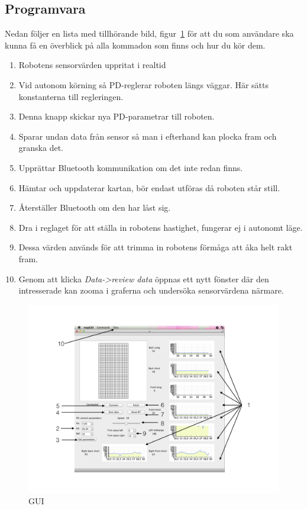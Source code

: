 \documentclass[a4paper,12pt,fleqn]{article}
\begin{document}
\subsection{Programvara}
Nedan följer en lista med tillhörande bild, figur~\ref{fig:gui_man} för att du som användare ska kunna få en överblick på alla kommadon som finns och hur du kör dem. 

\begin{enumerate}
	\item Robotens sensorvärden uppritat i realtid  
	\item Vid autonom körning så PD-reglerar roboten längs väggar. Här sätts konstanterna till regleringen.
	\item Denna knapp skickar nya PD-parametrar till roboten.
	\item Sparar undan data från sensor så man i efterhand kan plocka fram och granska det. 
	\item Upprättar Bluetooth kommunikation om det inte redan finns.
	\item Hämtar och uppdaterar kartan, bör endast utföras då roboten står still.
	\item Återställer Bluetooth om den har låst sig.
	\item Dra i reglaget för att ställa in robotens hastighet, fungerar ej i autonomt läge.
	\item Dessa värden används för att trimma in robotens förmåga att åka helt rakt fram. 
	\item Genom att klicka \emph{Data->review data} öppnas ett nytt fönster där den intresserade kan zooma i graferna och undersöka sensorvärdena närmare.  
\end{enumerate}	


\begin{figure}[htp] %
  \begin{center}
  \includegraphics[keepaspectratio=true,width=1\textwidth]{bilder/Gui_manual.png}  %
  \end{center}
  \caption{GUI} %
  \label{fig:gui_man} %
\end{figure}
\end{document}
